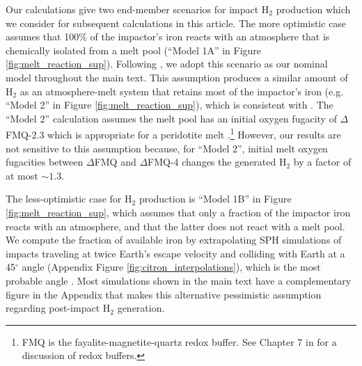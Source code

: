 Our calculations give two end-member scenarios for impact H$_2$ production which we consider for subsequent calculations in this article. The more optimistic case assumes that 100\% of the impactor's iron reacts with an atmosphere that is chemically isolated from a melt pool (``Model 1A'' in Figure \ref{fig:melt_reaction_sup}). Following \citet{Zahnle_2020}, we adopt this scenario as our nominal model throughout the main text. This assumption produces a similar amount of H$_2$ as an atmosphere-melt system that retains most of the impactor's iron (e.g. ``Model 2'' in Figure \ref{fig:melt_reaction_sup}), which is consistent with \citet{Itcovitz_2022}. The ``Model 2'' calculation assumes the melt pool has an initial oxygen fugacity of $\Delta$FMQ-2.3 which is appropriate for a peridotite melt \citep{Itcovitz_2022}.\footnote{FMQ is the fayalite-magnetite-quartz redox buffer. See Chapter 7 in \citet{Catling_2017} for a discussion of redox buffers.} However, our results are not sensitive to this assumption because, for ``Model 2'', initial melt oxygen fugacities between $\Delta$FMQ and $\Delta$FMQ-4 changes the generated H$_2$ by a factor of at most $\sim 1.3$.

The less-optimistic case for H$_2$ production is ``Model 1B'' in Figure \ref{fig:melt_reaction_sup}, which assumes that only a fraction of the impactor iron reacts with an atmosphere, and that the latter does not react with a melt pool. We compute the fraction of available iron by extrapolating SPH simulations of impacts traveling at twice Earth's escape velocity and colliding with Earth at a 45$^{\circ}$ angle (Appendix Figure \ref{fig:citron_interpolations}), which is the most probable angle \citep{Citron_2022}. Most simulations shown in the main text have a complementary figure in the Appendix that makes this alternative pessimistic assumption regarding post-impact H$_2$ generation.

